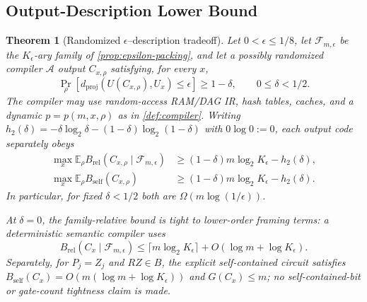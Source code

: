 \documentclass[aps,prx,reprint,floatfix,superscriptaddress]{revtex4-2}
\newtheorem{theorem}{Theorem}
\begin{document}
\subsection{Output-Description Lower Bound}

\begin{theorem}[Randomized $\epsilon$--description tradeoff]
\label{thm:output-counting}
Let $0<\epsilon\leq1/8$, let $\mathcal F_{m,\epsilon}$ be the
$K_\epsilon$-ary family of \cref{prop:epsilon-packing}, and let a possibly
randomized compiler $\mathcal A$ output $C_{x,\rho}$ satisfying, for every
$x$,
\begin{equation}\label{eq:random-success}
 \Pr_\rho\!\left[
 d_{\mathrm{proj}}(U(C_{x,\rho}),U_x)\leq\epsilon
 \right]\geq1-\delta,
 \qquad 0\leq\delta<1/2.
\end{equation}
The compiler may use random-access RAM/DAG IR, hash tables, caches, and a
dynamic $p=p(m,x,\rho)$ as in \cref{def:compiler}.  Writing
$h_2(\delta)=-\delta\log_2\delta-(1-\delta)\log_2(1-\delta)$ with
$0\log 0:=0$, each output
code separately obeys
\begin{equation}\label{eq:output-counting}
\begin{aligned}
 \max_x\mathbb E_\rho
 B_{\mathrm{rel}}(C_{x,\rho}\mid\mathcal F_{m,\epsilon})
 &\geq(1-\delta)m\log_2K_\epsilon-h_2(\delta),\\
 \max_x\mathbb E_\rho B_{\mathrm{self}}(C_{x,\rho})
 &\geq(1-\delta)m\log_2K_\epsilon-h_2(\delta).
\end{aligned}
\end{equation}
In particular, for fixed $\delta<1/2$ both are
$\Omega(m\log(1/\epsilon))$.

At $\delta=0$, the family-relative bound is tight to lower-order framing
terms: a deterministic semantic compiler uses
\begin{equation}\label{eq:relative-epsilon-upper}
 B_{\mathrm{rel}}(C_x\mid\mathcal F_{m,\epsilon})
 \leq\lceil m\log_2K_\epsilon\rceil
       +O(\log m+\log K_\epsilon).
\end{equation}
Separately, for $P_j=Z_j$ and $RZ\in B$, the explicit self-contained
circuit satisfies
$B_{\mathrm{self}}(C_x)=O(m(\log m+\log K_\epsilon))$ and $G(C_x)\leq m$;
no self-contained-bit or gate-count tightness claim is made.
\end{theorem}
\end{document}

